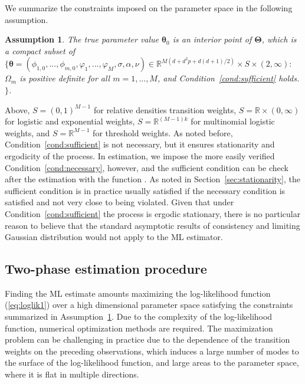 \documentclass[nojss]{jss}
\newtheorem{assumption}{Assumption}
\begin{document}
We summarize the constraints imposed on the parameter space in the following assumption.
%
\begin{assumption}\label{as:mle}
The true parameter value $\boldsymbol{\theta}_0$ is an interior point of $\boldsymbol{\Theta}$, which is a compact subset of
$\lbrace \boldsymbol{\theta}=(\phi_{1,0},...,\phi_{m,0},\varphi_1,...,\varphi_M,\sigma,\alpha,\nu)\in\mathbb{R}^{M(d + d^2p + d(d+1)/2)}\times S\times (2,\infty):$ $\Omega_m$ is positive definite for all $m=1,...,M$, and Condition~\ref{cond:sufficient} holds.
$\rbrace$.
\end{assumption}
%
Above, $S=(0,1)^{M-1}$ for relative densities transition weights, $S=\mathbb{R}\times (0,\infty)$ for logistic and exponential weights, $S=\mathbb{R}^{(M-1)k}$ for multinomial logistic weights, and $S=\mathbb{R}^{M-1}$ for threshold weights. As noted before, Condition~\ref{cond:sufficient} is not necessary, but it ensures stationarity and ergodicity of the process. In estimation, we impose the more easily verified Condition~\ref{cond:necessary}, however, and the sufficient condition can be check after the estimation with the function . As noted in Section~\ref{sec:stationarity}, the sufficient condition is in practice usually satisfied if the necessary condition is satisfied and not very close to being violated. Given that under Condition~\ref{cond:sufficient} the process is ergodic stationary, there is no particular reason to believe that the standard asymptotic results of consistency and limiting Gaussian distribution would not apply to the ML estimator.

\subsection{Two-phase estimation procedure}\label{sec:estimscheme}
Finding the ML estimate amounts maximizing the log-likelihood function (\ref{eq:loglik1}) over a high dimensional parameter space satisfying the constraints summarized in Assumption~\ref{as:mle}. Due to the complexity of the log-likelihood function, numerical optimization methods are required. The maximization problem can be challenging in practice due to the dependence of the transition weights on the preceding observations, which induces a large number of modes to the surface of the log-likelihood function, and large areas to the parameter space, where it is flat in multiple directions.
\end{document}
